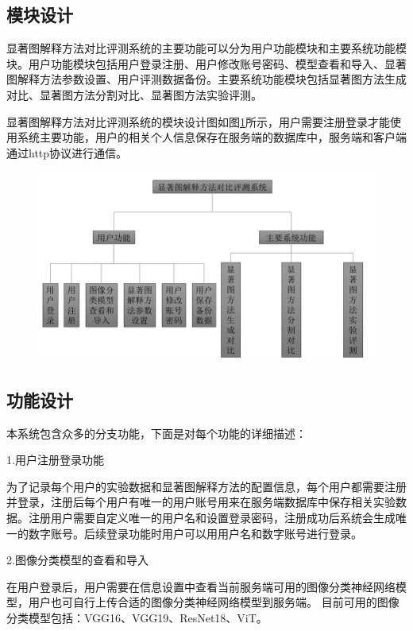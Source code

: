 \subsection{模块设计}
显著图解释方法对比评测系统的主要功能可以分为用户功能模块和主要系统功能模块。用户功能模块包括用户登录注册、用户修改账号密码、模型查看和导入、显著图解释方法参数设置、用户评测数据备份。主要系统功能模块包括显著图方法生成对比、显著图方法分割对比、显著图方法实验评测。

显著图解释方法对比评测系统的模块设计图如图\ref{fig:function}所示，用户需要注册登录才能使用系统主要功能，用户的相关个人信息保存在服务端的数据库中，服务端和客户端通过http协议进行通信。

\begin{figure}[h]
	\centering 
	\includegraphics[width=15cm]{fig/ch5/function.png}
	\label{fig:function}
\end{figure}

\subsection{功能设计}

本系统包含众多的分支功能，下面是对每个功能的详细描述：

1.用户注册登录功能

为了记录每个用户的实验数据和显著图解释方法的配置信息，每个用户都需要注册并登录，注册后每个用户有唯一的用户账号用来在服务端数据库中保存相关实验数据。注册用户需要自定义唯一的用户名和设置登录密码，注册成功后系统会生成唯一的数字账号。后续登录功能时用户可以用用户名和数字账号进行登录。

2.图像分类模型的查看和导入

在用户登录后，用户需要在信息设置中查看当前服务端可用的图像分类神经网络模型，用户也可自行上传合适的图像分类神经网络模型到服务端。
目前可用的图像分类模型包括：VGG16、VGG19、ResNet18、ViT。

